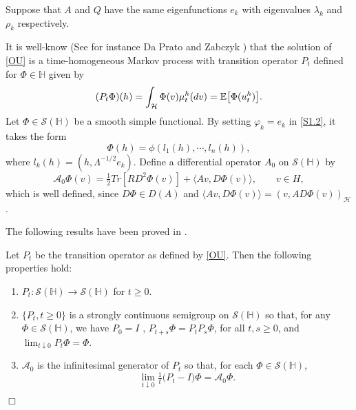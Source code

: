 \documentclass[review, onefignum, onetabnum]{siamart171218}
\begin{document}
Suppose that $A$ and $Q$ have the same eigenfunctions $e_k$ with eigenvalues
$\lambda_k$ and $\rho_k$ respectively.

    It is well-know (See for instance Da Prato and Zabczyk \cite{da-za}) that
the solution of \eqref{OU} is a time-homogeneous Markov process with transition
operator $P_t$  defined for $\Phi\in\mathbb{H}$ given by
\begin{equation}
    (P_t\Phi)(h)=
        \int_{\mathcal{H}}
             \Phi(v) \mu_t ^ h(dv)
             = \mathbb{E}
             \big[
                \Phi(u_t^h)
             \big].
\end{equation}
    Let $\Phi\in\mathcal{S}(\mathbb{H})$ be a smooth simple functional. By
setting $\varphi_k = e_k$ in \eqref{S1.2}, it takes the form
\[
  \Phi(h) = \phi(l_1(h), \cdots, l_n (h)),
\]
where $l_k(h) = (h, \Lambda^{-1/2} e_k )$. Define a differential operator
$A_0$
on $\mathcal{S}(\mathbb{H})$ by
\begin{equation}\label{def-A0}
  \mathcal{A}_0
    \Phi(v) = \tfrac{1}{2}Tr [RD^2 \Phi(v)] + \langle Av, D\Phi(v)\rangle
    ,\qquad v \in H,
\end{equation}
which is well defined, since $D\Phi \in D(A)$ and
$\langle Av, D\Phi(v)\rangle = (v, A D \Phi(v))_\mathcal{H}$.

The following results have been proved in \cite{liu}.
\begin{lemma}
    Let $P_t$ be the transition operator as defined by \eqref{OU}. Then
    the following properties hold:
    \begin{enumerate}
     \item
        $P_t : \mathcal{S}(\mathbb{H})\rightarrow  \mathcal{S}(\mathbb{H})$
        for $t \ge 0$.
    \item
        $\{P_t , t \ge 0\}$
        is a strongly continuous semigroup on
        $\mathcal{S}(\mathbb{H})$ so that, for any
        $\Phi \in \mathcal{S}(\mathbb{H})$, we have $P_0 = I$ ,
        $P_{t+s} \Phi = P_t P_s \Phi$, for all $t, s \ge 0$, and
        $\lim_{t\downarrow 0}
        P_t \Phi = \Phi$.
    \item
        $\mathcal{A}_0$ is the infinitesimal generator of $P_t$ so that, for
        each $\Phi\in\mathcal{S}(\mathbb{H})$,
        \[
            \lim_{t\downarrow 0} \tfrac{1}{t}\big(P_t- I\big)\Phi
                = \mathcal{A}_0\Phi.
        \]
    \end{enumerate}
    \hfill $\Box$
\end{lemma}
\end{document}
